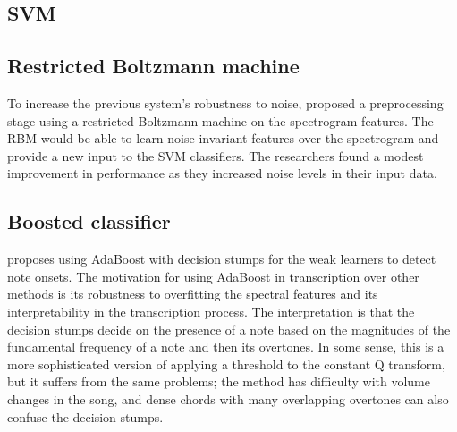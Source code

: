 \documentclass[5p]{elsarticle}
\begin{document}
\subsection{SVM}

\citet{poliner2006discriminative}



\subsection{Restricted Boltzmann machine}

To increase the previous system's robustness to noise, \citet{nam2011classification} proposed a preprocessing stage using a restricted Boltzmann machine on the spectrogram features. The RBM would be able to learn noise invariant features over the spectrogram and provide a new input to the SVM classifiers. The researchers found a modest improvement in performance as they increased noise levels in their input data.

\subsection{Boosted classifier}

\citet{boogaart2009note} proposes using AdaBoost with decision stumps for the weak learners to detect note onsets. The motivation for using AdaBoost in transcription over other methods is its robustness to overfitting the spectral features and its interpretability in the transcription process. The interpretation is that the decision stumps decide on the presence of a note based on the magnitudes of the fundamental frequency of a note and then its overtones. In some sense, this is a more sophisticated version of applying a threshold to the constant Q transform, but it suffers from the same problems; the method has difficulty with volume changes in the song, and dense chords with many overlapping overtones can also confuse the decision stumps.

\end{document}
